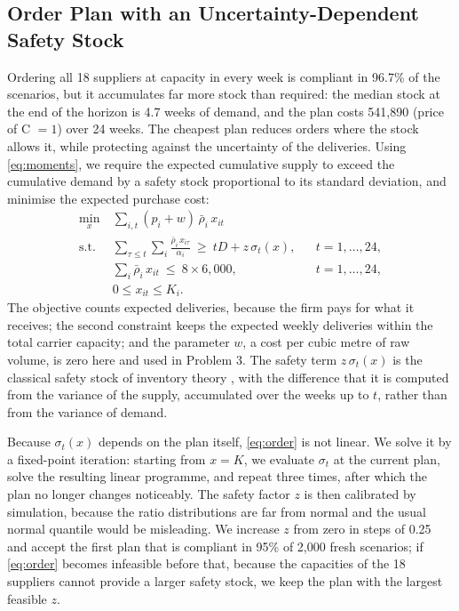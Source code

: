 \documentclass[11pt,a4paper]{article}
\begin{document}
\subsection{Order Plan with an Uncertainty-Dependent Safety Stock}
Ordering all 18 suppliers at capacity in every week is compliant in 96.7\% of the scenarios, but it accumulates far more stock than required: the median stock at the end of the horizon is 4.7 weeks of demand, and the plan costs 541{,}890 (price of C $=1$) over 24 weeks.
The cheapest plan reduces orders where the stock allows it, while protecting against the uncertainty of the deliveries.
Using \cref{eq:moments}, we require the expected cumulative supply to exceed the cumulative demand by a safety stock proportional to its standard deviation, and minimise the expected purchase cost:
\begin{equation}\label{eq:order}
\begin{aligned}
\min_{x}\ & \sum_{i,t}(p_i+w)\,\bar\rho_i\,x_{it}\\
\text{s.t.}\ & \sum_{\tau\le t}\sum_i \frac{\bar\rho_i\,x_{i\tau}}{\alpha_i}\ \ge\ tD + z\,\sigma_t(x), && t=1,\dots,24,\\
& \sum_i \bar\rho_i\,x_{it}\ \le\ 8\times 6{,}000, && t=1,\dots,24,\\
& 0\le x_{it}\le K_i .
\end{aligned}
\end{equation}
The objective counts expected deliveries, because the firm pays for what it receives; the second constraint keeps the expected weekly deliveries within the total carrier capacity; and the parameter $w$, a cost per cubic metre of raw volume, is zero here and used in Problem 3.
The safety term $z\,\sigma_t(x)$ is the classical safety stock of inventory theory \citep{silver2016}, with the difference that it is computed from the variance of the supply, accumulated over the weeks up to $t$, rather than from the variance of demand.

Because $\sigma_t(x)$ depends on the plan itself, \cref{eq:order} is not linear.
We solve it by a fixed-point iteration: starting from $x=K$, we evaluate $\sigma_t$ at the current plan, solve the resulting linear programme, and repeat three times, after which the plan no longer changes noticeably.
The safety factor $z$ is then calibrated by simulation, because the ratio distributions are far from normal and the usual normal quantile would be misleading.
We increase $z$ from zero in steps of 0.25 and accept the first plan that is compliant in 95\% of 2{,}000 fresh scenarios; if \cref{eq:order} becomes infeasible before that, because the capacities of the 18 suppliers cannot provide a larger safety stock, we keep the plan with the largest feasible $z$.
\end{document}
